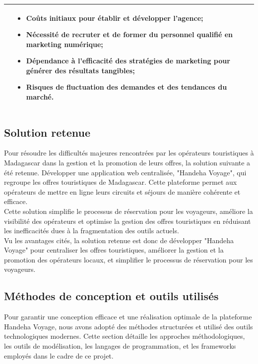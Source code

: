 \documentclass[12pt]{report}
\begin{document}
\begin{longtable}{|p{5cm}|p{5cm}|p{5cm}|}
\begin{itemize}
					\end{itemize}
					&
					\begin{itemize}
						\item Coûts initiaux pour établir et développer l'agence;
						\item Nécessité de recruter et de former du personnel qualifié en marketing numérique;
						\item Dépendance à l'efficacité des stratégies de marketing pour générer des résultats tangibles;
						\item Risques de fluctuation des demandes et des tendances du marché.
					\end{itemize}\\						

					\hline
				\end{longtable}
				\FloatBarrier


				\subsection{Solution retenue}

				\hspace{15pt} Pour résoudre les difficultés majeures rencontrées par les opérateurs touristiques à Madagascar dans la gestion et la promotion de leurs offres, la solution suivante a été retenue. Développer une application web centralisée, "Handeha Voyage", qui regroupe les offres touristiques de Madagascar. Cette plateforme permet aux opérateurs de mettre en ligne leurs circuits et séjours de manière cohérente et efficace.\\

				Cette solution simplifie le processus de réservation pour les voyageurs, améliore la visibilité des opérateurs et optimise la gestion des offres touristiques en réduisant les inefficacités dues à la fragmentation des outils actuels.\\

				Vu les avantages cités, la solution retenue est donc de développer "Handeha Voyage" pour centraliser les offres touristiques, améliorer la gestion et la promotion des opérateurs locaux, et simplifier le processus de réservation pour les voyageurs.

				\subsection{Méthodes de conception et outils utilisés}
		
				\hspace{15pt}Pour garantir une conception efficace et une réalisation optimale de la plateforme Handeha Voyage, nous avons adopté des méthodes structurées et utilisé des outils technologiques modernes. Cette section détaille les approches méthodologiques, les outils de modélisation, les langages de programmation, et les frameworks employés dans le cadre de ce projet.					
\end{document}
